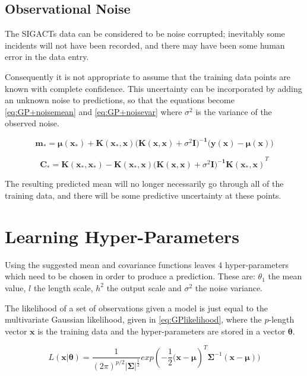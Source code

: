 \documentclass[a4paper,11pt]{report}
\begin{document}
\subsection{Observational Noise}

The SIGACTs data can be considered to be noise corrupted; inevitably some incidents will not have been recorded, and there may have been some human error in the data entry. 

Consequently it is not appropriate to assume that the training data points are known with complete confidence. This uncertainty can be incorporated by adding an unknown noise to predictions, so that the equations become \ref{eq:GP+noisemean} and \ref{eq:GP+noisevar} where \( \sigma^2 \) is the variance of the observed noise.

\singlespacing


\begin{equation} \label{eq:GP+noisemean}
\mathbf{m_*} = \boldsymbol{\mu} \mathbf{(x_*) + K(x_* ,x) (K(x,x)}+\sigma^2 \mathbf{I)^{-1} (y(x)} - \boldsymbol{\mu} \mathbf{(x))}
\end{equation}

\begin{equation} \label{eq:GP+noisevar}
\mathbf{ C_* = K(x_*,x_*)-K(x_*,x) (K(x,x)}+\sigma^2 \mathbf{I)^{-1} K(x_*,x)}^{T}
\end{equation}

\doublespacing

The resulting predicted mean will no longer necessarily go through all of the training data, and there will be some predictive uncertainty at these points.

\section{Learning Hyper-Parameters}
Using the suggested mean and covariance functions leaves 4 hyper-parameters which need to be chosen in order to produce a prediction. These are: \(\theta_1\) the mean value, \(l\) the length scale, \(h^2\) the output scale and \(\sigma^2\) the noise variance. 

The likelihood of a set of observations given a model is just equal to the multivariate Gaussian likelihood, given in \ref{eq:GPlikelihood}, where the \(p\)-length vector \(\mathbf{x}\) is the training data and the hyper-parameters are stored in a vector \(\mathbf{\theta}\).

\begin{equation} \label{eq:GPlikelihood}
L(\mathbf{x | \theta}) = \frac{1}{(2\pi)^{p/2} |\boldsymbol{\Sigma|}^{\frac{1}{2}}} exp(- \frac{1}{2} \mathbf{(x}-\boldsymbol{\mu})^{T}\boldsymbol{\Sigma}^{-1}(\mathbf{x}-\boldsymbol{\mu}))
\end{equation}
\end{document}
